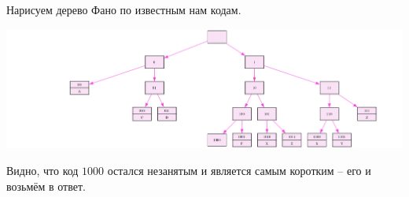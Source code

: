 \documentclass[14pt,a4paper]{article}
\begin{document}
Нарисуем дерево Фано по известным нам кодам.

\begin{center}
    \includegraphics[width=1.0\textwidth]{tree.png}
\end{center}

Видно, что код $1000$ остался незанятым и является самым коротким
-- его и возьмём в ответ.
\end{document}
